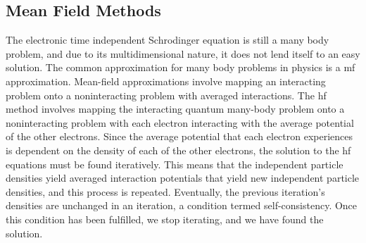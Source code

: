 \subsection{Mean Field Methods}
The electronic time independent Schrodinger equation is still a many body problem, and due to its multidimensional nature, it does not lend itself to an easy solution.
The common approximation for many body problems in physics is a \gls{mf} approximation.
Mean-field approximations involve mapping an interacting problem onto a noninteracting problem with averaged interactions.
The \gls{hf} method involves mapping the interacting quantum many-body problem onto a noninteracting problem with each electron interacting with the average potential of the other electrons.
Since the average potential that each electron experiences is dependent on the density of each of the other electrons, the solution to the \gls{hf} equations must be found iteratively.
This means that the independent particle densities yield averaged interaction potentials that yield new independent particle densities, and this process is repeated.
Eventually, the previous iteration's densities are unchanged in an iteration, a condition termed self-consistency.
Once this condition has been fulfilled, we stop iterating, and we have found the  solution.

